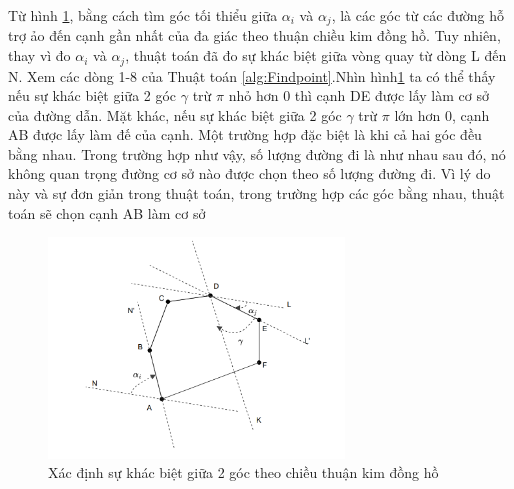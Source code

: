  Từ hình \ref{fig:anh3}, bằng cách tìm góc tối thiểu giữa $\alpha_{i}$ và $\alpha_{j}$, là các góc từ các đường hỗ trợ ảo đến cạnh gần nhất của đa giác theo thuận chiều kim đồng hồ. Tuy nhiên, thay vì đo $\alpha_{i}$ và $\alpha_{j}$, thuật toán đã đo sự khác biệt giữa vòng quay từ dòng L đến N. Xem các dòng 1-8 của Thuật toán \ref{alg:Findpoint}.Nhìn hình\ref{fig:anh3} ta có thể thấy nếu sự khác biệt giữa 2 góc $\gamma$  trừ $\pi$ nhỏ hơn 0 thì cạnh DE được lấy làm cơ sở của đường dẫn. Mặt khác, nếu sự khác biệt giữa 2 góc $\gamma$  trừ $\pi$ lớn hơn 0,  cạnh AB được lấy làm đế của cạnh. Một trường hợp đặc biệt là khi cả hai góc đều bằng nhau. Trong trường hợp như vậy, số lượng đường đi là như nhau sau đó, nó không quan trọng đường cơ sở nào được chọn theo số lượng đường đi. Vì lý do này và sự đơn giản trong thuật toán, trong trường hợp các góc bằng nhau, thuật toán sẽ chọn cạnh AB làm cơ sở
    \begin{figure}[H]
        \centering
        \includegraphics[width=0.7\textwidth]{chapter4/image/anh3.png}
        \caption{Xác định sự khác biệt giữa 2 góc theo chiều thuận kim đồng hồ}
        \label{fig:anh3}
    \end{figure}

